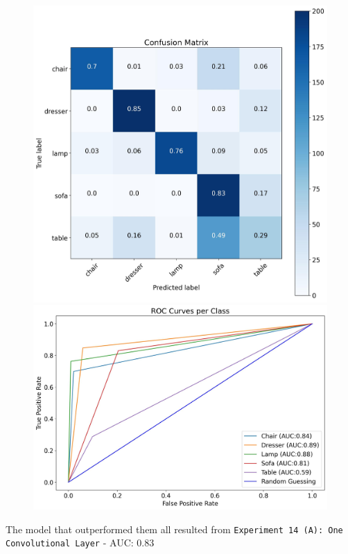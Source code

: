 \documentclass[11pt,a4paper]{article}
\begin{document}
\begin{figure}[H]
{{    \includegraphics[scale=0.13]{imgs/experiments/images/14-3/Experiment-14-3-TESTING-confusion-matrix.jpg}
    \includegraphics[scale=0.13]{imgs/experiments/images/14-3/Experiment-14-3-TESTING-ROC.jpg}
    }}
\end{figure}
\noindent
The model that outperformed them all resulted from \texttt{Experiment 14 (A): One Convolutional Layer} - AUC: $0.83$
\end{document}
